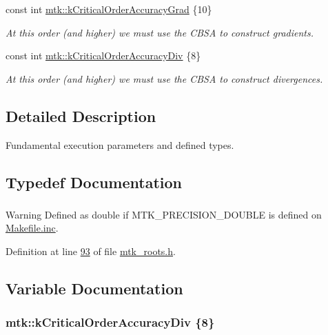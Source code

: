 \begin{DoxyCompactItemize}
const int \hyperlink{group__c01-roots_ga295dd2f403c775ecd942c22b5a777496}{mtk\+::k\+Critical\+Order\+Accuracy\+Grad} \{10\}
\begin{DoxyCompactList}\small\item\em At this order (and higher) we must use the C\+B\+S\+A to construct gradients. \end{DoxyCompactList}\item 
const int \hyperlink{group__c01-roots_ga0898eef2108473e44a5223932d571c31}{mtk\+::k\+Critical\+Order\+Accuracy\+Div} \{8\}
\begin{DoxyCompactList}\small\item\em At this order (and higher) we must use the C\+B\+S\+A to construct divergences. \end{DoxyCompactList}\end{DoxyCompactItemize}


\subsection{Detailed Description}
Fundamental execution parameters and defined types. 

\subsection{Typedef Documentation}
\hypertarget{group__c01-roots_gac080bbbf5cbb5502c9f00405f894857d}{
\subsubsection[{Real}]{}}\label{group__c01-roots_gac080bbbf5cbb5502c9f00405f894857d}
\begin{DoxyWarning}{Warning}
Defined as double if M\+T\+K\+\_\+\+P\+R\+E\+C\+I\+S\+I\+O\+N\+\_\+\+D\+O\+U\+B\+L\+E is defined on \hyperlink{Makefile_8inc}{Makefile.\+inc}. 
\end{DoxyWarning}


Definition at line \hyperlink{mtk__roots_8h_source_l00093}{93} of file \hyperlink{mtk__roots_8h_source}{mtk\+\_\+roots.\+h}.



\subsection{Variable Documentation}
\hypertarget{group__c01-roots_ga0898eef2108473e44a5223932d571c31}{
\subsubsection[{k\+Critical\+Order\+Accuracy\+Div}]{\setlength{\rightskip}{0pt plus 5cm}mtk\+::k\+Critical\+Order\+Accuracy\+Div \{8\}}}\label{group__c01-roots_ga0898eef2108473e44a5223932d571c31}


